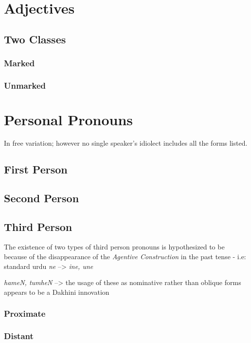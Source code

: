 \documentclass[a4paper]{article}
\begin{document}
\section{Adjectives}

\subsection{Two Classes}

\subsubsection{Marked}

\subsubsection{Unmarked}

\section{Personal Pronouns}

In free variation; however no single speaker's idiolect includes all the forms listed.

\subsection{First Person}

\subsection{Second Person}

\subsection{Third Person}

The existence of two types of third person pronouns is hypothesized to be because of the disappearance of the \emph{Agentive Construction} in the past tense - i.e: standard urdu \textit{ne} --> \textit{ine, une}

\textit{hameN, tumheN} --> the usage of these as nominative rather than oblique forms appears to be a Dakhini innovation

\subsubsection{Proximate}
\subsubsection{Distant}
\end{document}
